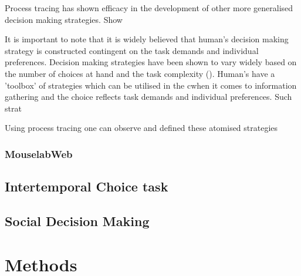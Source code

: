 \documentclass[man, floatsintext]{apa7}
\begin{document}
Process tracing has shown efficacy in the development of other more generalised decision making strategies. Show


It is important to note that it is widely believed that human's decision making strategy is constructed contingent on the task demands and individual preferences. Decision making strategies have been shown to vary widely based on the number of choices at hand and the task complexity (\cite{payneWalkingScarecrowInformation2004}). Human's have a 'toolbox' of strategies which can be utilised in the cwhen it comes to information gathering and the choice reflects task demands and individual preferences. Such strat

Using process tracing one can observe and defined these atomised strategies 




\subsubsection{MouselabWeb}

\subsection{Intertemporal Choice task}

\subsection{Social Decision Making}


\section{Methods}


%
%
%
\end{document}
